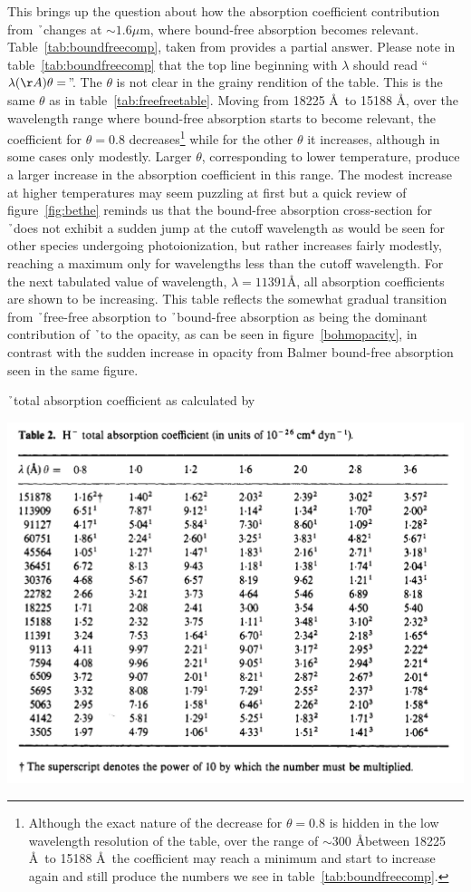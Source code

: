 This brings up the question about how the absorption coefficient contribution from \h\ changes at $\sim 1.6 \mu$m, where bound-free absorption becomes relevant.  Table~\ref{tab:boundfreecomp}, taken from \cite{bell1975} provides a partial answer.  Please note in table~\ref{tab:boundfreecomp} that the top line beginning with $\lambda$ should read ``$\lambda(\AA)\theta=$''. The $\theta$ is not clear in the grainy rendition of the table.  This is the same $\theta$ as in table~\ref{tab:freefreetable}.  Moving from 18225 \AA\ to 15188 \AA, over the wavelength range where bound-free absorption starts to become relevant, the coefficient for $\theta=$0.8 decreases\footnote{Although the exact nature of the decrease for $\theta=$0.8 is hidden in the low wavelength resolution of the table, over the range of $\sim$300 \AA between 18225 \AA\ to 15188 \AA\ the coefficient may reach a minimum and start to increase again and still produce the numbers we see in table~\ref{tab:boundfreecomp}.} while for the other $\theta$ it increases, although in some cases only modestly. Larger $\theta$, corresponding to lower temperature, produce a larger increase in the absorption coefficient in this range.  The modest increase at higher temperatures may seem puzzling at first but a quick review of figure~\ref{fig:bethe} reminds us that the bound-free absorption cross-section for \h\ does not exhibit a sudden jump at the cutoff wavelength as would be seen for other species undergoing photoionization, but rather increases fairly modestly, reaching a maximum only for wavelengths less than the cutoff wavelength.  For the next tabulated value of wavelength, $\lambda=11391$\AA, all absorption coefficients are shown to be increasing.  This table reflects the somewhat gradual transition from \h\ free-free absorption to \h\ bound-free absorption as being the dominant contribution of \h\ to the opacity, as can be seen in figure~\ref{bohmopacity}, in contrast with the sudden increase in opacity from Balmer bound-free absorption seen in the same figure.
\begin{table}
\caption{\label{tab:boundfreecomp}\h\ total absorption coefficient as calculated by \cite{bell1975}}
\includegraphics[width=\linewidth]{figs/freeandboundtable.png}
\end{table}

